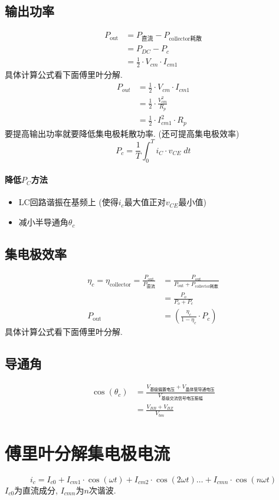 \documentclass[a4paper]{report}
\begin{document}
\subsection{输出功率}
\begin{align*}
  P_{\text{out}}&=P_{\text{直流}}-P_{\text{collector耗散}}\\
  &=P_{DC}-P_c\\
  &=\frac{1}{2}\cdot V_{cm}\cdot I_{cm1}
\end{align*}
具体计算公式看下面傅里叶分解. 
\begin{align*}
  P_{out}&=\frac{1}{2}\cdot V_{cm}\cdot I_{cm1}\\
  &=\frac{1}{2}\cdot \frac{V_{cm}^2}{R_p}\\
  &=\frac{1}{2}\cdot I_{cm1}^2\cdot R_p
\end{align*}
要提高输出功率就要降低集电极耗散功率. (还可提高集电极效率)
$$P_c=\frac{1}{T}\int_0^T i_C\cdot v_{CE} \;dt$$
\paragraph{降低$P_C$方法}
\begin{itemize}
  \item LC回路谐振在基频上 (使得$i_c$最大值正对$v_{CE}$最小值)
  \item 减小半导通角$\theta_c$
\end{itemize}
\subsection{集电极效率}
\begin{align*}
  \eta_c=\eta_{\text{collector}}=\frac{P_{\text{out}}}{P_{\text{直流}}}&=\frac{P_{\text{out}}}{P_{\text{out}}+P_{\text{collector耗散}}}\\
  &=\frac{P_o}{P_o+P_c}\\
  P_\text{out}&=(\frac{\eta_c}{1-\eta_c}\cdot P_c)
\end{align*}
具体计算公式看下面傅里叶分解. 
\subsection{导通角}
\begin{align*}
  \cos(\theta_c)&=\frac{V_{\text{基级偏置电压}}+V_{\text{晶体管导通电压}}}{V_{\text{基级交流信号电压振幅}}}\\
  &=\frac{V_{BB}+V_{BZ}}{V_{bm}}
\end{align*}
\section{傅里叶分解集电极电流}
$$i_c=I_{c0}+I_{cm1}\cdot\cos(\omega t)+I_{cm2}\cdot\cos(2\omega t)\dots +I_{cmn}\cdot\cos(n\omega t)$$
$I_{c0}$为直流成分, $I_{cmn}$为$n$次谐波. 
\end{document}
